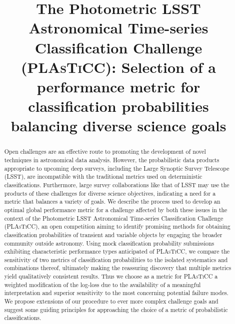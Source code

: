 \documentclass[\docopts]{\docclass}
\begin{document}
\linenumbers

\title{The Photometric \textsc{LSST} Astronomical Time-series Classification Challenge (\textsc{PLAsTiCC}): Selection of a performance metric for classification probabilities balancing diverse science goals}

\maketitlepre

\begin{abstract}

  Open challenges are an effective route to promoting the development of novel techniques in astronomical data analysis.
  However, the probabilistic data products appropriate to upcoming deep surveys, including the Large Synoptic Survey Telescope (\textsc{LSST}), are incompatible with the traditional metrics used on deterministic classifications.
  Furthermore, large survey collaborations like that of \textsc{LSST} may use the products of these challenges for diverse science objectives, indicating a need for a metric that balances a variety of goals.
  We describe the process used to develop an optimal global performance metric for a challenge affected by both these issues in the context of the Photometric \textsc{LSST} Astronomical Time-series Classification Challenge (\textsc{PLAsTiCC}), an open competition aiming to identify promising methods for obtaining classification probabilities of transient and variable objects by engaging the broader community outside astronomy.
  Using mock classification probability submissions exhibiting characteristic performance types anticipated of \textsc{PLAsTiCC}, we compare the sensitivity of two metrics of classification probabilities to the isolated systematics and combinations thereof, ultimately making the reassuring discovery that multiple metrics yield qualitatively consistent results.
  Thus we choose as a metric for \textsc{PLAsTiCC} a weighted modification of the log-loss due to the availability of a meaningful interpretation and superior sensitivity to the most concerning potential failure modes.
  We propose extensions of our procedure to ever more complex challenge goals and suggest some guiding principles for approaching the choice of a metric of probabilistic classifications.

\end{abstract}

\dockeys{}

\maketitlepost

\end{document}
